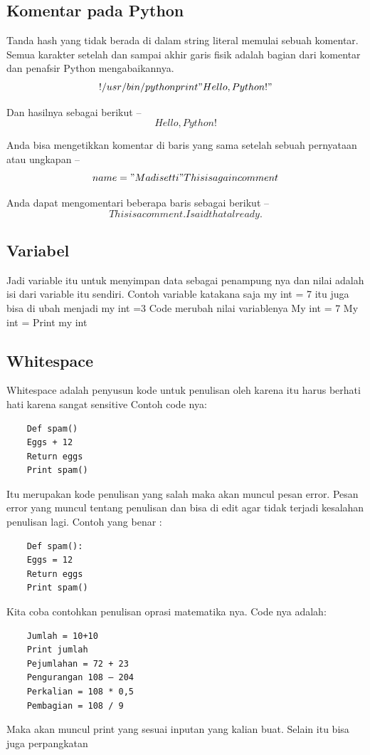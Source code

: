\subsection{Komentar pada Python}
Tanda hash yang tidak berada di dalam string literal memulai sebuah komentar. Semua karakter setelah dan sampai akhir garis fisik adalah bagian dari komentar dan penafsir Python mengabaikannya.
	\begin{equation}
	!/usr/bin/python
	print "Hello, Python!" 
	\end{equation}

	 Dan hasilnya sebagai berikut –
	\begin{equation}
	    Hello, Python!
	\end{equation}

Anda bisa mengetikkan komentar di baris yang sama setelah sebuah pernyataan atau ungkapan –
	\begin{equation}
	    name = "Madisetti"  This is again comment
	\end{equation}

Anda dapat mengomentari beberapa baris sebagai berikut –
	\begin{equation}
	This is a comment.
	I said that already.
	\end{equation}
	
	

\subsection{Variabel}	

 Jadi variable itu untuk menyimpan data sebagai penampung nya dan nilai adalah isi dari variable itu sendiri.
Contoh variable katakana saja my int = 7 itu juga bisa di ubah menjadi my int =3  
Code merubah nilai variablenya  
	My int = 7
	My int = 
	Print my int 

\subsection{Whitespace} 
Whitespace adalah penyusun kode untuk penulisan oleh karena itu harus berhati hati karena sangat sensitive
Contoh code nya: 
 \begin{verbatim}
 	Def spam() 
	Eggs + 12 
 	Return eggs 
 	Print spam()
 \end{verbatim}
Itu merupakan kode penulisan yang salah maka akan muncul pesan error.
Pesan error yang muncul tentang penulisan dan bisa di edit agar tidak terjadi kesalahan penulisan lagi.
Contoh yang benar :  
 \begin{verbatim}
 	Def spam(): 
 	Eggs = 12 
 	Return eggs 
 	Print spam() 
 \end{verbatim}
Kita coba contohkan penulisan oprasi matematika nya.
Code nya adalah: 
 \begin{verbatim}	
	Jumlah = 10+10 
	Print jumlah 
	Pejumlahan = 72 + 23 
	Pengurangan 108 – 204 
	Perkalian = 108 * 0,5 
	Pembagian = 108 / 9 
 \end{verbatim}
Maka akan muncul print yang sesuai inputan yang kalian buat. 
Selain itu bisa juga perpangkatan 

